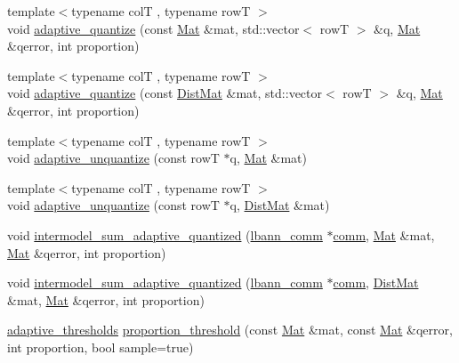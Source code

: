 \begin{DoxyCompactItemize}
\item 
{\footnotesize template$<$typename colT , typename rowT $>$ }\\void \hyperlink{classlbann_1_1lbann__quantizer_a7e4dfca5770dfd88ae6255b0407d8f80}{adaptive\+\_\+quantize} (const \hyperlink{base_8hpp_a68f11fdc31b62516cb310831bbe54d73}{Mat} \&mat, std\+::vector$<$ rowT $>$ \&q, \hyperlink{base_8hpp_a68f11fdc31b62516cb310831bbe54d73}{Mat} \&qerror, int proportion)
\item 
{\footnotesize template$<$typename colT , typename rowT $>$ }\\void \hyperlink{classlbann_1_1lbann__quantizer_a737865bb555db8a8a104fb345f7626b2}{adaptive\+\_\+quantize} (const \hyperlink{base_8hpp_a0fab5387556805cfeac3e7e567bf66c5}{Dist\+Mat} \&mat, std\+::vector$<$ rowT $>$ \&q, \hyperlink{base_8hpp_a68f11fdc31b62516cb310831bbe54d73}{Mat} \&qerror, int proportion)
\item 
{\footnotesize template$<$typename colT , typename rowT $>$ }\\void \hyperlink{classlbann_1_1lbann__quantizer_acf8d21e8114a00fdea53d919d76dd511}{adaptive\+\_\+unquantize} (const rowT $\ast$q, \hyperlink{base_8hpp_a68f11fdc31b62516cb310831bbe54d73}{Mat} \&mat)
\item 
{\footnotesize template$<$typename colT , typename rowT $>$ }\\void \hyperlink{classlbann_1_1lbann__quantizer_a5456c31af080fce7f85aa7a01b7ee939}{adaptive\+\_\+unquantize} (const rowT $\ast$q, \hyperlink{base_8hpp_a0fab5387556805cfeac3e7e567bf66c5}{Dist\+Mat} \&mat)
\item 
void \hyperlink{classlbann_1_1lbann__quantizer_a87e856d8bf5e8a678a39cdb8f547dfd9}{intermodel\+\_\+sum\+\_\+adaptive\+\_\+quantized} (\hyperlink{classlbann_1_1lbann__comm}{lbann\+\_\+comm} $\ast$\hyperlink{file__io_8cpp_ab048c6f9fcbcfaa57ce68b00263dbebe}{comm}, \hyperlink{base_8hpp_a68f11fdc31b62516cb310831bbe54d73}{Mat} \&mat, \hyperlink{base_8hpp_a68f11fdc31b62516cb310831bbe54d73}{Mat} \&qerror, int proportion)
\item 
void \hyperlink{classlbann_1_1lbann__quantizer_aa2d4e5b9bc90f8feaaa32f3fc4183d10}{intermodel\+\_\+sum\+\_\+adaptive\+\_\+quantized} (\hyperlink{classlbann_1_1lbann__comm}{lbann\+\_\+comm} $\ast$\hyperlink{file__io_8cpp_ab048c6f9fcbcfaa57ce68b00263dbebe}{comm}, \hyperlink{base_8hpp_a0fab5387556805cfeac3e7e567bf66c5}{Dist\+Mat} \&mat, \hyperlink{base_8hpp_a68f11fdc31b62516cb310831bbe54d73}{Mat} \&qerror, int proportion)
\item 
\hyperlink{structlbann_1_1lbann__quantizer_1_1adaptive__thresholds}{adaptive\+\_\+thresholds} \hyperlink{classlbann_1_1lbann__quantizer_aa5aabc1cb4163e95aee993d9b37b9b32}{proportion\+\_\+threshold} (const \hyperlink{base_8hpp_a68f11fdc31b62516cb310831bbe54d73}{Mat} \&mat, const \hyperlink{base_8hpp_a68f11fdc31b62516cb310831bbe54d73}{Mat} \&qerror, int proportion, bool sample=true)

\end{DoxyCompactItemize}
